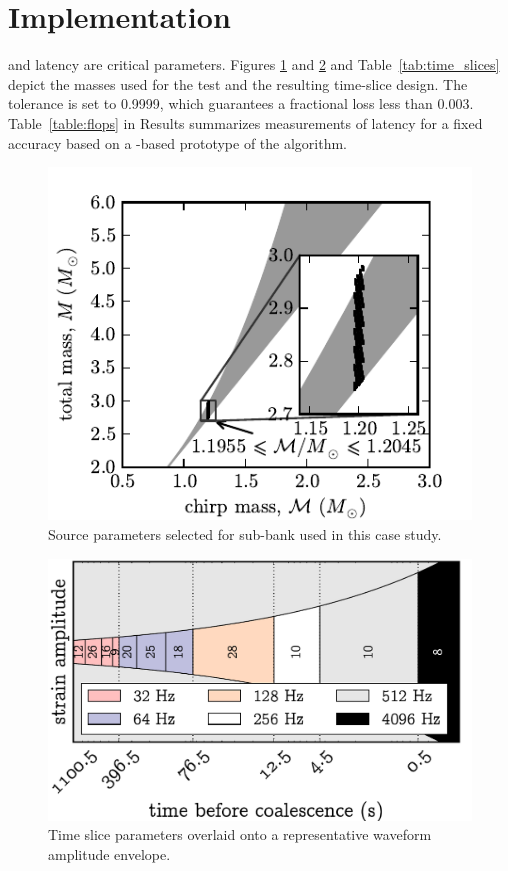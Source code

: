 \documentclass[portrait,plainboxedsections]{sciposter}
\begin{document}
\begin{minipage}[t]{0.25\textwidth}

\section*{Implementation}

 and latency are critical parameters. Figures
\ref{fig:tmpltbank} and \ref{fig:time_slices} and Table~\ref{tab:time_slices}
depict the masses used for the test and the resulting time-slice design. The
\SVD{} tolerance is set to 0.9999, which guarantees a fractional \SNR{} loss
less than 0.003. Table~\ref{table:flops} in Results summarizes measurements of
latency for a fixed accuracy based on a \gstreamer{}-based prototype of the
\lloid{} algorithm.

\begin{figure}[h]
	\includegraphics[width=\textwidth]{figures/tmpltbank}
	\caption{\label{fig:tmpltbank}Source parameters selected for sub-bank used in this
case study.}
\end{figure}

\begin{figure}
\includegraphics[width=\textwidth]{figures/envelope}
\caption{\label{fig:time_slices} Time slice parameters overlaid onto a representative waveform amplitude envelope.}
\end{figure}


\end{minipage}
\end{document}
